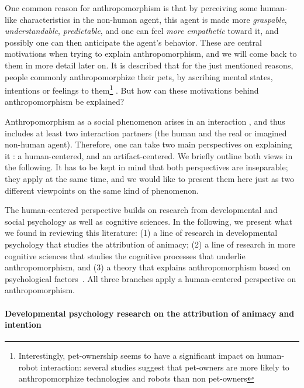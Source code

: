 \documentclass{frontiersSCNS} %
\begin{document}
One common reason for anthropomorphism is that by perceiving some human-like characteristics in the non-human agent, this agent is made more \emph{graspable}, \emph{understandable}, \emph{predictable}, and one can feel \emph{more empathetic} toward it, and possibly one can then anticipate the agent's behavior. These are central motivations when trying to explain anthropomorphism, and we will come back to them in more detail later on. 
It is described that for the just mentioned reasons, people commonly anthropomorphize their pets, by ascribing mental states, intentions or feelings to them\footnote{Interestingly, pet-ownership seems to have a significant impact on human-robot interaction: several studies suggest that pet-owners are more likely to anthropomorphize technologies and robots than non pet-owners} \cite{eddy_attribution_1993}. But how can these motivations behind anthropomorphism be explained?

Anthropomorphism as a social phenomenon arises in an interaction \citep{persson_anthropomorphism_2000}, and thus includes at least two interaction partners (the human and the real or imagined non-human agent). Therefore, one can take two main perspectives on explaining it \citep{lee_human_2005}: a human-centered, and an artifact-centered. We briefly outline both views in the following. It has to be kept in mind that both perspectives are inseparable; they apply at the same time, and we would like to present them here just as two different viewpoints on the same kind of phenomenon.


The human-centered perspective builds on research from developmental and social psychology as well as cognitive sciences.  In the following, we present what we found in reviewing this literature: (1) a line of research in developmental psychology that studies the attribution of animacy; (2) a line of research in more cognitive sciences that studies the cognitive processes that underlie anthropomorphism, and (3) a theory that explains anthropomorphism based on psychological factors~\citep{epley_seeing_2007}. All three branches apply a human-centered perspective on anthropomorphism.


\paragraph*{Developmental psychology research on the attribution of animacy and intention\\}
\end{document}
